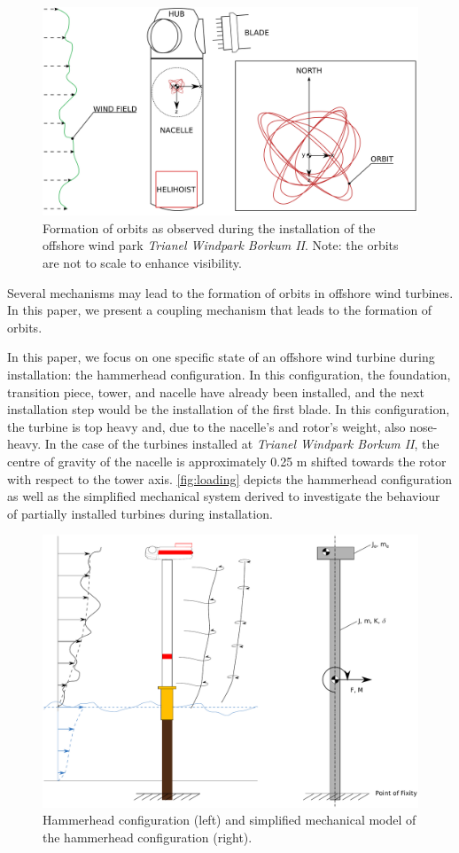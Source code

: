 \documentclass{article}
\begin{document}
\begin{figure}[ht!]
    \centering
    \includegraphics[width=0.7\linewidth]{manuscript/figures/installation_alt2.png}
    \caption{Formation of orbits as observed during the installation of the offshore wind park \textit{Trianel Windpark Borkum II}. Note: the orbits are not to scale to enhance visibility.}
    \label{fig:orbit}
\end{figure}

Several mechanisms may lead to the formation of orbits in offshore wind turbines. In this paper, we present a coupling mechanism that leads to the formation of orbits. 

In this paper, we focus on one specific state of an offshore wind turbine during installation: the hammerhead configuration. In this configuration, the foundation, transition piece, tower, and nacelle have already been installed, and the next installation step would be the installation of the first blade. In this configuration, the turbine is top heavy and, due to the nacelle's and rotor's weight, also nose-heavy. In the case of the turbines installed at \textit{Trianel Windpark Borkum II}, the centre of gravity of the nacelle is approximately 0.25 m shifted towards the rotor with respect to the tower axis. \autoref{fig:loading} depicts the hammerhead configuration as well as the simplified mechanical system derived to investigate the behaviour of partially installed turbines during installation. 

\begin{figure}[ht!]
    \centering
    \includegraphics[width=0.7\linewidth]{manuscript/figures/loading_3.pdf}
    \caption{Hammerhead configuration (left) and simplified mechanical model of the hammerhead configuration (right).}
    \label{fig:loading}
\end{figure}
\end{document}
